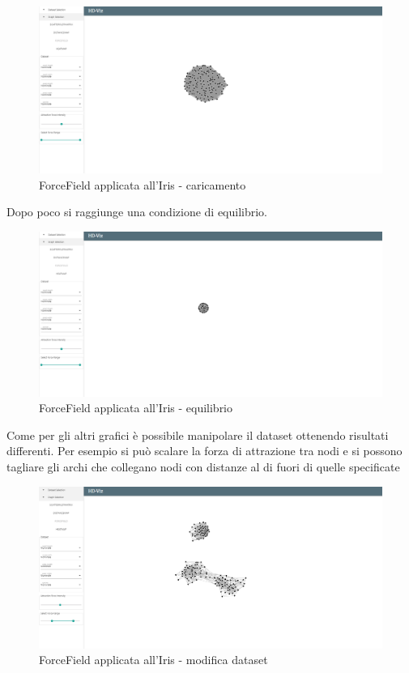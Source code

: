 \documentclass[../manuale_utente.tex]{subfiles}
\begin{document}
\begin{figure}[H]
	\centering
	\includegraphics[width=18cm]{src/img/ff/ff_iris_0_1}
	\caption{ForceField applicata all'Iris - caricamento}
\end{figure}

Dopo poco si raggiunge una condizione di equilibrio. 

\begin{figure}[H]
	\centering
	\includegraphics[width=18cm]{src/img/ff/ff_iris_0_2}
	\caption{ForceField applicata all'Iris - equilibrio}
\end{figure}


Come per gli altri grafici è possibile manipolare il dataset ottenendo risultati differenti. Per esempio si può scalare la forza di attrazione tra nodi e si possono tagliare gli archi che collegano nodi con distanze al di fuori di quelle specificate

\begin{figure}[H]
	\centering
	\includegraphics[width=18cm]{src/img/ff/ff_iris_1}
	\caption{ForceField applicata all'Iris - modifica dataset}
\end{figure}
\end{document}
